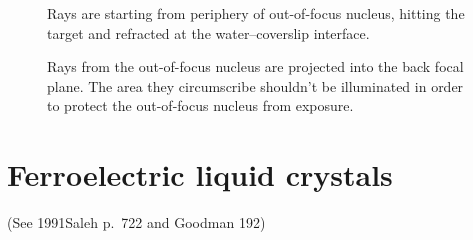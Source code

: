 \documentclass[twocolumn,DIV19]{scrartcl}
\begin{document}
\begin{figure}[!hbt]
  \centering
  \caption{Rays are starting from periphery of out-of-focus nucleus,
    hitting the target and refracted at the water--coverslip
    interface.}
\end{figure}

\begin{figure}[!hbt]
  \centering
  \caption{Rays from the out-of-focus nucleus are projected into the
    back focal plane. The area they circumscribe shouldn't be
    illuminated in order to protect the out-of-focus nucleus from exposure.}
  \label{fig:projection-schematic}
\end{figure}


\newpage
\section{Ferroelectric liquid crystals}
(See 1991Saleh p.~722 and Goodman 192)
\end{document}
